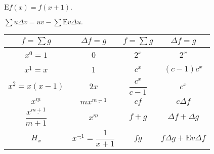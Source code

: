 \begin{definition}
    $\mathrm{E}f(x)=f(x+1).$
\end{definition}

\begin{theorem}[分部和公式]
    $\displaystyle\sum u\varDelta v=uv-\sum\mathrm{E}v\varDelta u.$
\end{theorem}

\setcounter{magicrownumbers}{0}
\begin{table}[H]
    \centering
    \begin{tabular}{c c | c c}
        $f=\sum g$                         & $\varDelta f=g$                     & $f=\sum g$           & $\varDelta f=g$                       \\
        \midrule
        $x^{\underline{0}}=1$              & 0                                   & $2^{x}$              & $2^{x}$                               \\
        $x^{\underline{1}}=x$              & 1                                   & $c^{x}$              & $(c-1)c^{x}$                          \\
        $x^{\underline{2}}=x(x-1)$         & $2x$                                & $\dfrac{c^{x}}{c-1}$ & $c^x$                                 \\
        $x^{\underline{m}}$                & $mx^{\underline{m-1}}$              & $cf$                 & $c\varDelta f$                        \\
        $\dfrac{x^{\underline{m+1}}}{m+1}$ & $x^{\underline{m}}$                 & $f+g$                & $\varDelta f+\varDelta g$             \\
        $H_x$                              & $x^{\underline{-1}}=\dfrac{1}{x+1}$ & $fg$                 & $f\varDelta g+\mathrm{E}v\varDelta f$
    \end{tabular}
\end{table}

